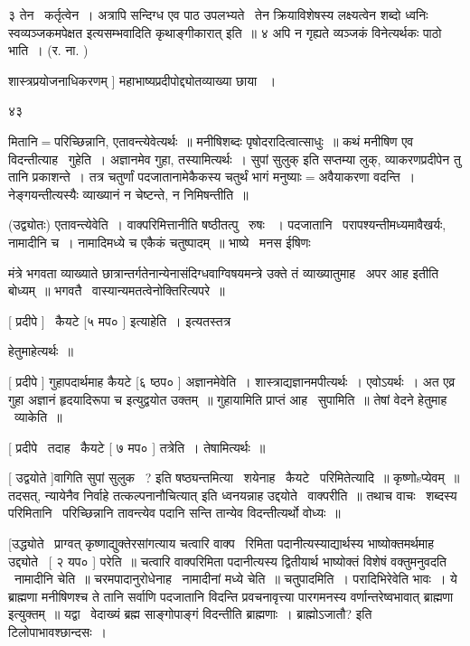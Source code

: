 \documentclass[11pt, openany]{book}
\begin{document}
३ तेन \textendash\ कर्तृत्वेन~। अत्रापि सन्दिग्ध एव पाठ उपलभ्यते \textendash\ {\qt तेन क्रियाविशेषस्य
लक्ष्यत्वेन शब्दो ध्वनिः स्वव्यञ्जकमपेक्षत इत्यसम्भवादिति
कृथाङ्गीकारात्} इति~॥ ४ अपि न गृह्यते व्यञ्जकं विनेत्यर्थकः पाठो भाति~। 
(र. ना. ) 

शास्त्रप्रयोजनाधिकरणम् ] महाभाष्यप्रदीपोद्द्योतव्याख्या छाया
 ~। 

 ४३



मितानि$=$परिच्छिन्नानि, एतावन्त्येवेत्यर्थः~॥ मनीषिशब्दः
पृषोदरादित्वात्साधुः~॥ कथं मनीषिण एव विदन्तीत्याह \textendash\ गुहेति~। अज्ञानमेव
गुहा, तस्यामित्यर्थः~। {\qt सुपां सुलुक्} इति सप्तम्या लुक्,
व्याकरणप्रदीपेन तु तानि प्रकाशन्ते~। तत्र चतुर्णां पदजातानामेकैकस्य
चतुर्थं भागं मनुष्याः$=$अवैयाकरणा वदन्ति~। नेङ्गयन्तीत्यस्यैः व्याख्यानं न
चेष्टन्ते, न निमिषन्तीति~॥ 

 (उद्व्योतः) एतावन्त्येवेति~। वाक्परिमित्तानीति षष्ठीतत्पु \textendash\ रुषः
~। पदजातानि \textendash\ परापश्यन्तीमध्यमावैखर्यः, नामादीनि च~। नामादिमध्ये च
एकैकं चतुष्पादम्~॥ भाष्ये \textendash\ मनस ईषिणः \textendash\ 



मंत्रे भगवता व्याख्याते छात्रान्तर्गतेनान्येनासंदिग्धवाग्विषयमन्त्रे
उक्ते तं व्याख्यातुमाह \textendash\ {\qt अपर आह} इतीति बोध्यम्~॥ भगवतै \textendash\ 
वास्यान्यमतत्वेनोक्तिरित्यपरे~॥ 

 [ प्रदीपे ] \textendash\ कैयटे [५ मप० ] इत्याहेति~। इत्यतस्तत्र 

हेतुमाहेत्यर्थः~॥ 

 [ प्रदीपे ] गुहापदार्थमाह कैयटे [६ ष्ठप० ] अज्ञानमेवेति~। 
शास्त्राद्यज्ञानमपीत्यर्थः~। एवोऽयर्थः~। अत एव्र {\qt गुहा अज्ञानं
हृदयादिरूपा च} इत्युद्वयोत उक्तम्~॥ गुहायामिति प्राप्तं आह \textendash\ सुपामिति~॥
तेषां वेदने हेतुमाह \textendash\ व्याकेति~॥ 

 [ प्रदीपे \textendash\ तदाह \textendash\ कैयटे [ ७ मप० ] तत्रेति~। तेषामित्यर्थः~॥ 

 [ उद्वयोते ]वागिति सुपां सुलुक \textendash\ ? इति षष्ठ्यन्तमित्या \textendash\ 
शयेनाह \textendash\ कैयटे \textendash\ परिमितेत्यादि~॥ कृष्णोsप्येवम्~॥ तदसत्, न्यायेनैव
निर्वाहे तत्कल्पनानौचित्यात् इति ध्वनयन्नाह उद्दयोते \textendash\ वाक्परीति~॥ तथाच
वाचः \textendash\ शब्दस्य परिमितानि \textendash\ परिच्छिन्नानि तावन्त्येव पदानि सन्ति तान्येव
विदन्तीत्यर्थो वोध्यः~॥ 

 [उद्ध्योते \textendash\ प्राग्वत् कृष्णाद्युक्तेरसांगत्याय चत्वारि वाक्प \textendash\ 
रिमिता पदानीत्यस्याद्यार्थस्य भाष्योक्तमर्थमाह उद्द्योते \textendash\ [ २ यप० ]
परेति~॥ चत्वारि वाक्परिमिता पदानीत्यस्य द्वितीयार्थ भाष्योक्तं
विशेषं वक्तुमनुवदति \textendash\ नामादीनि चेति~॥ चरमपादानुरोधेनाह \textendash\ नामादीनां मध्ये
चेति~॥ चतु्पादमिति~। परादिभिरेवेति भावः~। ये ब्राह्मणा मनीषिणश्च ते
तानि सर्वाणि पदजातानि विदन्ति प्रवचनावृत्त्या पारगमनस्य
वर्णान्तरेष्वभावात् ब्राह्मणा इत्युक्तम्~॥ यद्वा \textendash\ वेदाख्यं ब्रह्म
साङ्गोपाङ्गं विदन्तीति ब्राह्मणाः~। ब्राह्मोऽजातौ? इति
टिलोपाभावश्छान्दसः~। 
\end{document}
